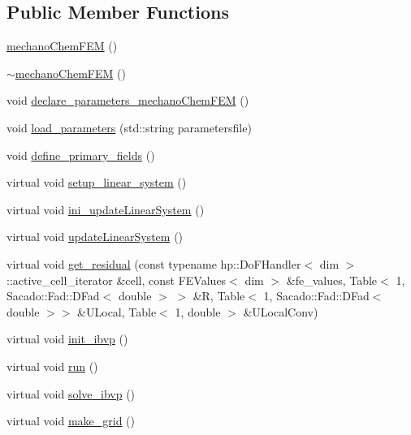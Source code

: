 \subsection*{Public Member Functions}
\begin{DoxyCompactItemize}
\item 
\hyperlink{classmechano_chem_f_e_m_ae86e36350c9dd3aef65944d2e926311a}{mechano\-Chem\-F\-E\-M} ()
\item 
\hyperlink{classmechano_chem_f_e_m_a6e2da9ee550880ddced1994080c38670}{$\sim$mechano\-Chem\-F\-E\-M} ()
\item 
void \hyperlink{classmechano_chem_f_e_m_aa745c884c3343abacbffa4669a72488d}{declare\-\_\-parameters\-\_\-mechano\-Chem\-F\-E\-M} ()
\item 
void \hyperlink{classmechano_chem_f_e_m_a5d2215a9bdbd1f1726f1e9c2182d2072}{load\-\_\-parameters} (std\-::string parametersfile)
\item 
void \hyperlink{classmechano_chem_f_e_m_a3d9afee26426f7a184185dba31a2d138}{define\-\_\-primary\-\_\-fields} ()
\item 
virtual void \hyperlink{classmechano_chem_f_e_m_a082302fff160a5e5535e6647af388389}{setup\-\_\-linear\-\_\-system} ()
\item 
virtual void \hyperlink{classmechano_chem_f_e_m_a295e0565636db5e7b8d22639182de706}{ini\-\_\-update\-Linear\-System} ()
\item 
virtual void \hyperlink{classmechano_chem_f_e_m_af78c2c6284234c93872188334fb997d8}{update\-Linear\-System} ()
\item 
virtual void \hyperlink{classmechano_chem_f_e_m_ac8f2c3e2a1040c70b709900dc3dfdaea}{get\-\_\-residual} (const typename hp\-::\-Do\-F\-Handler$<$ dim $>$\-::active\-\_\-cell\-\_\-iterator \&cell, const F\-E\-Values$<$ dim $>$ \&fe\-\_\-values, Table$<$ 1, Sacado\-::\-Fad\-::\-D\-Fad$<$ double $>$ $>$ \&R, Table$<$ 1, Sacado\-::\-Fad\-::\-D\-Fad$<$ double $>$$>$ \&U\-Local, Table$<$ 1, double $>$ \&U\-Local\-Conv)
\item 
virtual void \hyperlink{classmechano_chem_f_e_m_ad01ab2c3347ff55e8787624a97732182}{init\-\_\-ibvp} ()
\item 
virtual void \hyperlink{classmechano_chem_f_e_m_a13a43e6d814de94978c515cb084873b1}{run} ()
\item 
virtual void \hyperlink{classmechano_chem_f_e_m_a856108deee592fc9dde678b60a9b6596}{solve\-\_\-ibvp} ()
\item 
virtual void \hyperlink{classmechano_chem_f_e_m_aadd4943e52767516f3f7c5460ea35032}{make\-\_\-grid} ()
$$
\end{DoxyCompactItemize}
